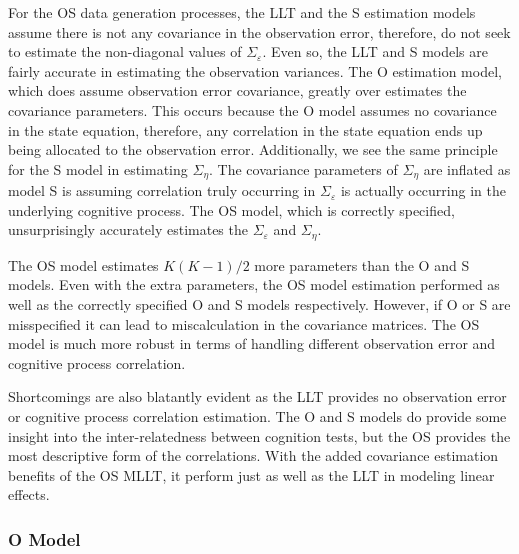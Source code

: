 \documentclass[
]{article}
\begin{document}
For the OS data generation processes, the LLT and the S estimation models assume there is not any covariance in the observation error, therefore, do not seek to estimate the non-diagonal values of \(\Sigma_\varepsilon\). Even so, the LLT and S models are fairly accurate in estimating the observation variances. The O estimation model, which does assume observation error covariance, greatly over estimates the covariance parameters. This occurs because the O model assumes no covariance in the state equation, therefore, any correlation in the state equation ends up being allocated to the observation error. Additionally, we see the same principle for the S model in estimating \(\Sigma_\eta\). The covariance parameters of \(\Sigma_\eta\) are inflated as model S is assuming correlation truly occurring in \(\Sigma_\varepsilon\) is actually occurring in the underlying cognitive process. The OS model, which is correctly specified, unsurprisingly accurately estimates the \(\Sigma_\varepsilon\) and \(\Sigma_\eta\).

The OS model estimates \(K(K-1)/2\) more parameters than the O and S models. Even with the extra parameters, the OS model estimation performed as well as the correctly specified O and S models respectively. However, if O or S are misspecified it can lead to miscalculation in the covariance matrices. The OS model is much more robust in terms of handling different observation error and cognitive process correlation.

Shortcomings are also blatantly evident as the LLT provides no observation error or cognitive process correlation estimation. The O and S models do provide some insight into the inter-relatedness between cognition tests, but the OS provides the most descriptive form of the correlations. With the added covariance estimation benefits of the OS MLLT, it perform just as well as the LLT in modeling linear effects.

\hypertarget{o-model-1}{%
\subsubsection{O Model}\label{o-model-1}}
\end{document}
